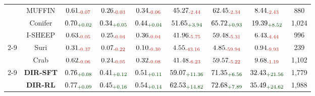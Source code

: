 \begin{table}[pos=tbp]
{\begin{tabular}{c|c|ccc|cc|cc}
& MUFFIN & $\text{0.61}_{\textcolor{deepred}{\text{-0.07}}}$ & $\text{0.26}_{\textcolor{deepred}{\text{-0.03}}}$ & $\text{0.34}_{\textcolor{deepred}{\text{-0.06}}}$ & $\text{45.27}_{\textcolor{deepred}{\text{-2.44}}}$ & $\text{62.45}_{\textcolor{deepred}{\text{-2.34}}}$ & $\text{8.44}_{\textcolor{deepred}{\text{-2.43}}}$ & 880 \\
& Conifer & $\text{0.70}_{\textcolor{deepgreen}{\text{+0.02}}}$ & $\text{0.34}_{\textcolor{deepgreen}{\text{+0.05}}}$ & $\text{0.44}_{\textcolor{deepgreen}{\text{+0.04}}}$ & $\text{51.65}_{\textcolor{deepgreen}{\text{+3.94}}}$ & $\text{65.72}_{\textcolor{deepgreen}{\text{+0.93}}}$ & $\text{19.39}_{\textcolor{deepgreen}{\text{+8.52}}}$ & 1,024 \\
& I-SHEEP & $\text{0.63}_{\textcolor{deepred}{\text{-0.05}}}$ & $\text{0.25}_{\textcolor{deepred}{\text{-0.04}}}$ & $\text{0.36}_{\textcolor{deepred}{\text{-0.04}}}$ & $\text{41.96}_{\textcolor{deepred}{\text{-5.75}}}$ & $\text{59.48}_{\textcolor{deepred}{\text{-5.31}}}$ & $\text{6.43}_{\textcolor{deepred}{\text{-4.44}}}$ & 996 \\
\cmidrule{2-9}
& Suri & $\text{0.31}_{\textcolor{deepred}{\text{-0.37}}}$ & $\text{0.07}_{\textcolor{deepred}{\text{-0.22}}}$ & $\text{0.10}_{\textcolor{deepred}{\text{-0.30}}}$ & $\text{4.55}_{\textcolor{deepred}{\text{-43.16}}}$ & $\text{4.85}_{\textcolor{deepred}{\text{-59.94}}}$ & $\text{0.94}_{\textcolor{deepred}{\text{-9.93}}}$ & 239 \\
& Crab & $\text{0.62}_{\textcolor{deepred}{\text{-0.06}}}$ & $\text{0.24}_{\textcolor{deepred}{\text{-0.05}}}$ & $\text{0.32}_{\textcolor{deepred}{\text{-0.08}}}$ & $\text{41.48}_{\textcolor{deepred}{\text{-6.23}}}$ & $\text{59.57}_{\textcolor{deepred}{\text{-5.22}}}$ & $\text{9.68}_{\textcolor{deepred}{\text{-1.19}}}$ & 1,102 \\
\cmidrule{2-9}
& \textbf{DIR-SFT} & \textbf{$\text{0.76}_{\textcolor{deepgreen}{\text{+0.08}}}$} & \textbf{$\text{0.41}_{\textcolor{deepgreen}{\text{+0.12}}}$} & \textbf{$\text{0.51}_{\textcolor{deepgreen}{\text{+0.11}}}$} & \textbf{$\text{59.07}_{\textcolor{deepgreen}{\text{+11.36}}}$} & \textbf{$\text{71.35}_{\textcolor{deepgreen}{\text{+6.56}}}$} & \textbf{$\text{32.43}_{\textcolor{deepgreen}{\text{+21.56}}}$} & 1,779 \\
& \textbf{DIR-RL} & \textbf{$\text{0.77}_{\textcolor{deepgreen}{\text{+0.09}}}$} & \textbf{$\text{0.45}_{\textcolor{deepgreen}{\text{+0.16}}}$} & \textbf{$\text{0.54}_{\textcolor{deepgreen}{\text{+0.14}}}$} & \textbf{$\text{62.53}_{\textcolor{deepgreen}{\text{+14.82}}}$} & \textbf{$\text{72.68}_{\textcolor{deepgreen}{\text{+7.89}}}$} & \textbf{$\text{35.49}_{\textcolor{deepgreen}{\text{+24.62}}}$} & 1,988 \\

\end{tabular}}
\end{table}
